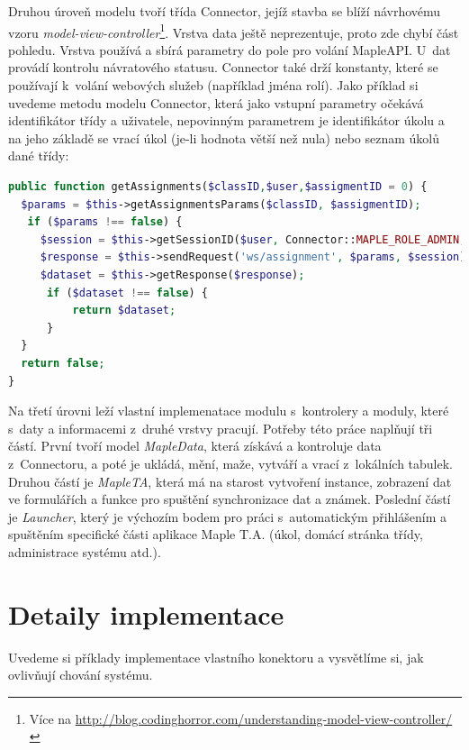 \documentclass[
print,
  11pt,
  table,   
  nolof,    
  nolot,
  oneside,final
]{fithesis3}
\begin{document}
Druhou úroveň modelu tvoří třída Connector, jejíž stavba se blíží návrhovému vzoru \emph{model-view-controller}\footnote{Více na \url{http://blog.codinghorror.com/understanding-model-view-controller/}}. Vrstva data ještě neprezentuje, proto zde chybí část pohledu. Vrstva používá a sbírá parametry do pole pro volání MapleAPI. U~dat provádí kontrolu návratového statusu. Connector také drží konstanty, které se používají k~volání webových služeb (například jména rolí). Jako příklad si uvedeme metodu modelu Connector, která jako vstupní parametry očekává identifikátor třídy a uživatele, nepovinným parametrem je identifikátor úkolu a na jeho základě se vrací úkol (je-li hodnota větší než nula) nebo seznam úkolů dané třídy:
\begin{lstlisting}[language=PHP, caption=Zpracování dat vrácených z Connectoru.]    
public function getAssignments($classID,$user,$assigmentID = 0) {
  $params = $this->getAssignmentsParams($classID, $assigmentID);
   if ($params !== false) {
     $session = $this->getSessionID($user, Connector::MAPLE_ROLE_ADMIN, $classID);
     $response = $this->sendRequest('ws/assignment', $params, $session);
     $dataset = $this->getResponse($response);
      if ($dataset !== false) {
          return $dataset;
      }
  }
  return false;
}

\end{lstlisting}

Na třetí úrovni leží vlastní implemenatace modulu s~kontrolery a moduly, které s~daty a informacemi z~druhé vrstvy pracují. Potřeby této práce naplňují tři částí. První tvoří model \emph{MapleData}, která získává a kontroluje data z~Connectoru, a poté je ukládá, mění, maže, vytváří a vrací z~lokálních tabulek. Druhou částí je \emph{MapleTA}, která má na starost vytvoření instance, zobrazení dat ve formulářích a funkce pro spuštění synchronizace dat a známek. Poslední částí je \emph{Launcher}, který je výchozím bodem pro práci s~automatickým přihlášením a spuštěním specifické části aplikace Maple T.A. (úkol, domácí stránka třídy, administrace systému atd.).

	\section{Detaily implementace}
Uvedeme si příklady implementace vlastního konektoru a vysvětlíme si, jak ovlivňují chování systému.
\end{document}
